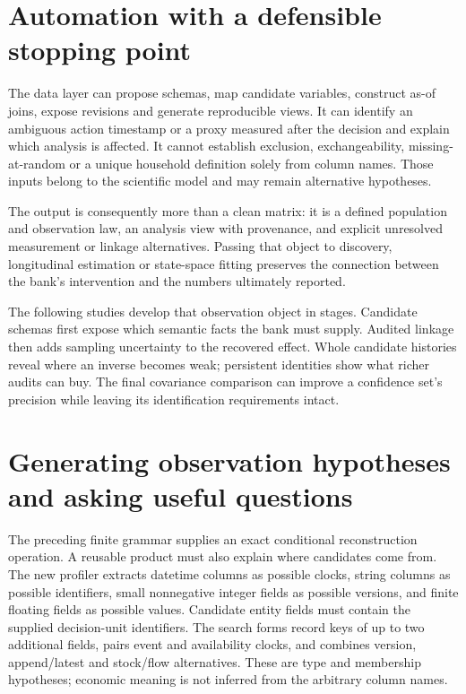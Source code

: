 

\section{Automation with a defensible stopping point}
The data layer can propose schemas, map candidate variables, construct
as-of joins, expose revisions and generate reproducible views. It can
identify an ambiguous action timestamp or a proxy measured after the
decision and explain which analysis is affected. It cannot establish
exclusion, exchangeability, missing-at-random or a unique household
definition solely from column names. Those inputs belong to the
scientific model and may remain alternative hypotheses.

The output is consequently more than a clean matrix: it is a defined
population and observation law, an analysis view with provenance, and
explicit unresolved measurement or linkage alternatives. Passing that
object to discovery, longitudinal estimation or state-space fitting
preserves the connection between the bank's intervention and the
numbers ultimately reported.

The following studies develop that observation object in stages. Candidate
schemas first expose which semantic facts the bank must supply. Audited
linkage then adds sampling uncertainty to the recovered effect. Whole
candidate histories reveal where an inverse becomes weak; persistent
identities show what richer audits can buy. The final covariance comparison
can improve a confidence set's precision while leaving its identification
requirements intact.



\section{Generating observation hypotheses and asking useful questions}
\label{s5:observation-generation}
The preceding finite grammar supplies an exact conditional reconstruction
operation. A reusable product must also explain where candidates come from.
The new profiler extracts datetime columns as possible clocks, string
columns as possible identifiers, small nonnegative integer fields as possible
versions, and finite floating fields as possible values. Candidate entity
fields must contain the supplied decision-unit identifiers. The search forms
record keys of up to two additional fields, pairs event and availability
clocks, and combines version, append/latest and stock/flow alternatives.
These are type and membership hypotheses; economic meaning is not inferred
from the arbitrary column names.

